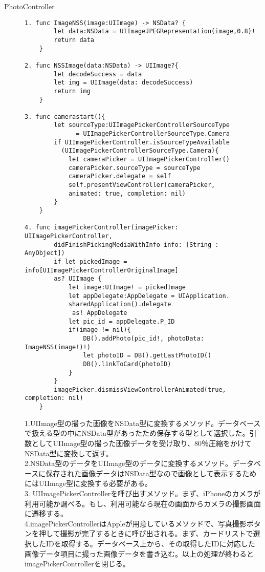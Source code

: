 \begin{description}
\item[PhotoController]\mbox{} 
\begin{lstlisting}[basicstyle=\ttfamily\footnotesize, frame=single]
1. func ImageNSS(image:UIImage) -> NSData? {
        let data:NSData = UIImageJPEGRepresentation(image,0.8)!
        return data
    }
    
2. func NSSImage(data:NSData) -> UIImage?{
        let decodeSuccess = data
        let img = UIImage(data: decodeSuccess)
        return img
    }

3. func camerastart(){
        let sourceType:UIImagePickerControllerSourceType 
        	  = UIImagePickerControllerSourceType.Camera
        if UIImagePickerController.isSourceTypeAvailable
          (UIImagePickerControllerSourceType.Camera){
            let cameraPicker = UIImagePickerController()
            cameraPicker.sourceType = sourceType
            cameraPicker.delegate = self
            self.presentViewController(cameraPicker, 
            animated: true, completion: nil)
        }
    }

4. func imagePickerController(imagePicker: UIImagePickerController, 
        didFinishPickingMediaWithInfo info: [String : AnyObject]) 
        if let pickedImage = info[UIImagePickerControllerOriginalImage] 
        as? UIImage {
            let image:UIImage! = pickedImage
            let appDelegate:AppDelegate = UIApplication.
            sharedApplication().delegate
             as! AppDelegate
            let pic_id = appDelegate.P_ID
            if(image != nil){
                DB().addPhoto(pic_id!, photoData: ImageNSS(image!)!)
                let photoID = DB().getLastPhotoID()
                DB().linkToCard(photoID)
            }
        }
        imagePicker.dismissViewControllerAnimated(true, completion: nil)
    }
 \end{lstlisting}

1.UIImage型の撮った画像をNSData型に変換するメソッド。データベースで扱える型の中にNSData型があったため保存する型として選択した。引数としてUIImage型の撮った画像データを受け取り、80％圧縮をかけてNSData型に変換して返す。\\
2.NSData型のデータをUIImage型のデータに変換するメソッド。データベースに保存された画像データはNSData型なので画像として表示するためにはUIImage型に変換する必要がある。\\
3. UIImagePickerControllerを呼び出すメソッド。まず、iPhoneのカメラが利用可能か調べる。もし、利用可能なら現在の画面からカメラの撮影画面に遷移する。\\
4.imagePickerControllerはAppleが用意しているメソッドで、写真撮影ボタンを押して撮影が完了するときに呼び出される。まず、カードリストで選択したIDを取得する。データベース上から、その取得したIDに対応した画像データ項目に撮った画像データを書き込む。以上の処理が終わるとimagePickerControllerを閉じる。\\


\end{description}

